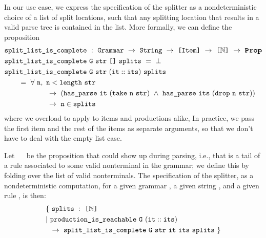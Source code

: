     In our use case, we express the specification of the splitter as a nondeterministic choice of a list of split locations, such that any splitting location that results in a valid parse tree is contained in the list.  More formally, we can define the proposition
\begin{align*}
  &\fname{split\_list\_is\_complete} ~:~\indname{Grammar}~\to~\indname{String}~\to~\typelist{\indname{Item}}~\to~\typelist{\mathbb{N}}~\to~\Prop \\
  &\fname{split\_list\_is\_complete}~\farg{G}~\farg{str}~\nil~\farg{splits}~=~\False \\
  &\fname{split\_list\_is\_complete} ~\farg{G}~\farg{str}~(\cons{\farg{it}}{\farg{its}}) ~\farg{splits} \\
  &\qquad=~\forall~\farg{n},~\farg{n}<\fname{length}~\farg{str} \\
  &\qquad\qquad\qquad\to~(\fname{has\_parse}~\farg{it}~(\fname{take}~\farg{n}~\farg{str})~\wedge~\fname{has\_parse}~\farg{its}~(\fname{drop}~\farg{n}~\farg{str})) \\
  &\qquad\qquad\qquad\to~\farg{n}\in\farg{splits}
\end{align*}
    where we overload  to apply to items and productions alike,   In practice, we pass the first item and the rest of the items as separate arguments, so that we don't have to deal with the empty list case.
    
    Let ~~ be the proposition that  could show up during parsing, i.e., that  is a tail of a rule associated to some valid nonterminal in the grammar; we define this by folding over the list of valid nonterminals.  The specification of the splitter, as a nondeterministic computation, for a given grammar , a given string , and a given rule , is then:
\begin{align*}
& \{~\texttt{splits}~:~\texttt{[}\mathbb{N}\texttt{]} \\
& |~\texttt{production\_is\_reachable}~\texttt{G}~(\texttt{it}::\texttt{its})\\
&\phantom{|~}\to~\texttt{split\_list\_is\_complete}~\texttt{G}~\texttt{str}~\texttt{it}~\texttt{its}~\texttt{splits}~\}
\end{align*}
    
